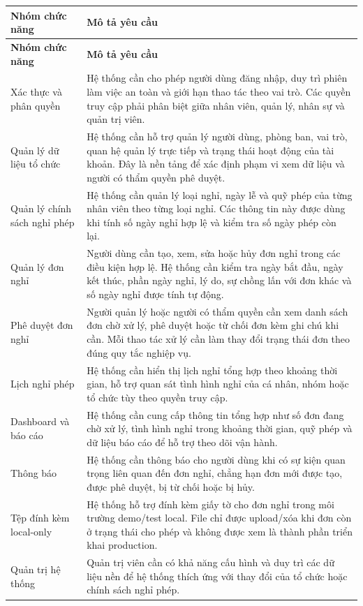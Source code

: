 \begin{longtable}{p{}p{}}
\toprule
\textbf{Nhóm chức năng} & \textbf{Mô tả yêu cầu} \\
\midrule
\endfirsthead
\toprule
\textbf{Nhóm chức năng} & \textbf{Mô tả yêu cầu} \\
\midrule
\endhead
Xác thực và phân quyền & Hệ thống cần cho phép người dùng đăng nhập, duy trì phiên làm việc an toàn và giới hạn thao tác theo vai trò. Các quyền truy cập phải phân biệt giữa nhân viên, quản lý, nhân sự và quản trị viên. \\
Quản lý dữ liệu tổ chức & Hệ thống cần hỗ trợ quản lý người dùng, phòng ban, vai trò, quan hệ quản lý trực tiếp và trạng thái hoạt động của tài khoản. Đây là nền tảng để xác định phạm vi xem dữ liệu và người có thẩm quyền phê duyệt. \\
Quản lý chính sách nghỉ phép & Hệ thống cần quản lý loại nghỉ, ngày lễ và quỹ phép của từng nhân viên theo từng loại nghỉ. Các thông tin này được dùng khi tính số ngày nghỉ hợp lệ và kiểm tra số ngày phép còn lại. \\
Quản lý đơn nghỉ & Người dùng cần tạo, xem, sửa hoặc hủy đơn nghỉ trong các điều kiện hợp lệ. Hệ thống cần kiểm tra ngày bắt đầu, ngày kết thúc, phần ngày nghỉ, lý do, sự chồng lấn với đơn khác và số ngày nghỉ được tính tự động. \\
Phê duyệt đơn nghỉ & Người quản lý hoặc người có thẩm quyền cần xem danh sách đơn chờ xử lý, phê duyệt hoặc từ chối đơn kèm ghi chú khi cần. Mỗi thao tác xử lý cần làm thay đổi trạng thái đơn theo đúng quy tắc nghiệp vụ. \\
Lịch nghỉ phép & Hệ thống cần hiển thị lịch nghỉ tổng hợp theo khoảng thời gian, hỗ trợ quan sát tình hình nghỉ của cá nhân, nhóm hoặc tổ chức tùy theo quyền truy cập. \\
Dashboard và báo cáo & Hệ thống cần cung cấp thông tin tổng hợp như số đơn đang chờ xử lý, tình hình nghỉ trong khoảng thời gian, quỹ phép và dữ liệu báo cáo để hỗ trợ theo dõi vận hành. \\
Thông báo & Hệ thống cần thông báo cho người dùng khi có sự kiện quan trọng liên quan đến đơn nghỉ, chẳng hạn đơn mới được tạo, được phê duyệt, bị từ chối hoặc bị hủy. \\
Tệp đính kèm local-only & Hệ thống hỗ trợ đính kèm giấy tờ cho đơn nghỉ trong môi trường demo/test local. File chỉ được upload/xóa khi đơn còn ở trạng thái cho phép và không được xem là thành phần triển khai production. \\
Quản trị hệ thống & Quản trị viên cần có khả năng cấu hình và duy trì các dữ liệu nền để hệ thống thích ứng với thay đổi của tổ chức hoặc chính sách nghỉ phép. \\
\bottomrule
\end{longtable}

